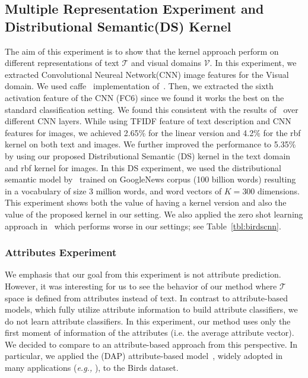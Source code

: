 \subsection{Multiple Representation Experiment and  Distributional Semantic(DS) Kernel}
\label{sec64}

The aim of this experiment is to show that the kernel approach perform on different representations of text $\mathcal{T}$ and visual domains $\mathcal{V}$. In this experiment, we extracted Convolutional Neureal Network(CNN) image features for the Visual domain. We used caffe~\cite{jia2014caffe} implementation of~\cite{imagenetnips12}. Then, we extracted the sixth activation feature of the CNN (FC6) since we found it works the best on the standard classification setting. We found this consistent with the results of~\cite{donahue2014decaf} over different CNN layers. While using  TFIDF feature of text description and CNN features for images, we achieved 2.65\% for the linear version and 4.2\% for the rbf kernel on both text and images. We further improved the performance to 5.35\% by using our proposed Distributional Semantic (DS) kernel in the text domain and rbf kernel for images. In this DS experiment, we used the  distributional semantic model by~\cite{mikolov2013distributed} trained on  GoogleNews corpus (100 billion words)  resulting in a vocabulary of size 3 million words, and word vectors of $K=300$ dimensions. This experiment shows both the value of having a kernel version and also the value of the proposed kernel in our setting. We also applied the zero shot learning approach in~\cite{norouzi2014zero} which performs worse in our settings; see Table~\ref{tbl:birdscnn}. 



\subsubsection{Attributes Experiment}

We emphasis that our  goal from this experiment is not attribute prediction. However, it was interesting for us to see the behavior of our method where $\mathcal{T}$ space is defined from attributes instead of text. In contrast to attribute-based models, which fully utilize attribute information to build attribute classifiers, we do not learn attribute classifiers. In this experiment, our method  uses only the first moment of information of the attributes (i.e. the average attribute vector). We decided to compare to an attribute-based approach from this perspective. In particular, we applied the  (DAP) attribute-based model~\cite{lampertPAMI13,Lampert09}, widely adopted in many applications (\textit{e.g.,} \cite{liu2013video,rohrbach11cvpr}), to the Birds dataset. 




